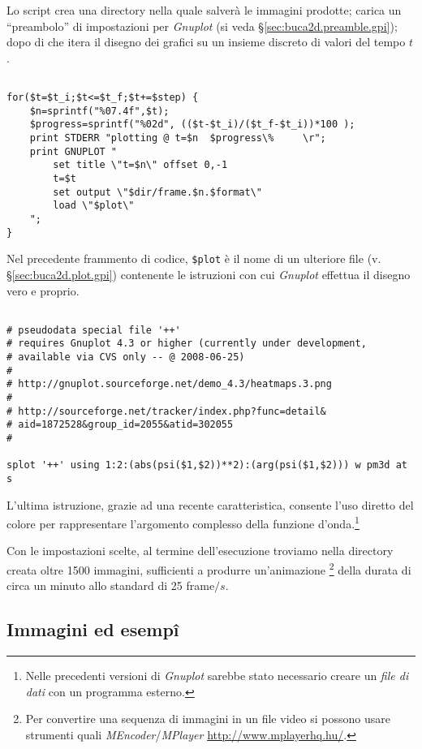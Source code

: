 Lo script crea una directory nella quale salverà le immagini prodotte;
carica un ``preambolo'' di impostazioni per \emph{Gnuplot} (si veda 
\S\ref{sec:buca2d.preamble.gpi}); dopo di che itera il disegno
dei grafici su un insieme discreto di valori del tempo $t$.
\begin{lstlisting}

for($t=$t_i;$t<=$t_f;$t+=$step) {
    $n=sprintf("%07.4f",$t);
    $progress=sprintf("%02d", (($t-$t_i)/($t_f-$t_i))*100 );
    print STDERR "plotting @ t=$n  $progress\%     \r";
    print GNUPLOT "
        set title \"t=$n\" offset 0,-1
        t=$t
        set output \"$dir/frame.$n.$format\"
        load \"$plot\"
    ";
}

\end{lstlisting}
Nel precedente frammento di codice, \texttt{\$plot} è
il nome di un ulteriore file (v. \S\ref{sec:buca2d.plot.gpi}) contenente le 
istruzioni con cui \emph{Gnuplot} effettua il disegno vero e proprio.
\begin{lstlisting}

# pseudodata special file '++'
# requires Gnuplot 4.3 or higher (currently under development, 
# available via CVS only -- @ 2008-06-25)
#
# http://gnuplot.sourceforge.net/demo_4.3/heatmaps.3.png
#
# http://sourceforge.net/tracker/index.php?func=detail&
# aid=1872528&group_id=2055&atid=302055
#

splot '++' using 1:2:(abs(psi($1,$2))**2):(arg(psi($1,$2))) w pm3d at s

\end{lstlisting}
L'ultima istruzione, grazie ad una recente caratteristica, consente 
l'uso diretto del colore per rappresentare l'argomento complesso 
della funzione d'onda.\footnote{ Nelle precedenti versioni 
di \emph{Gnuplot} sarebbe stato necessario creare un \emph{file di dati}
con un programma esterno.}

Con le impostazioni scelte, al termine dell'esecuzione 
troviamo nella directory creata oltre 1500 immagini,
sufficienti a produrre un'animazione \footnote{
  Per convertire una sequenza di immagini in un file video si possono
  usare strumenti quali \emph{MEncoder}/\emph{MPlayer}  
  \url{http://www.mplayerhq.hu/}.
}
della durata di circa un minuto allo standard 
di 25 frame$/s$.

\subsection{Immagini ed esemp\^{i}}

